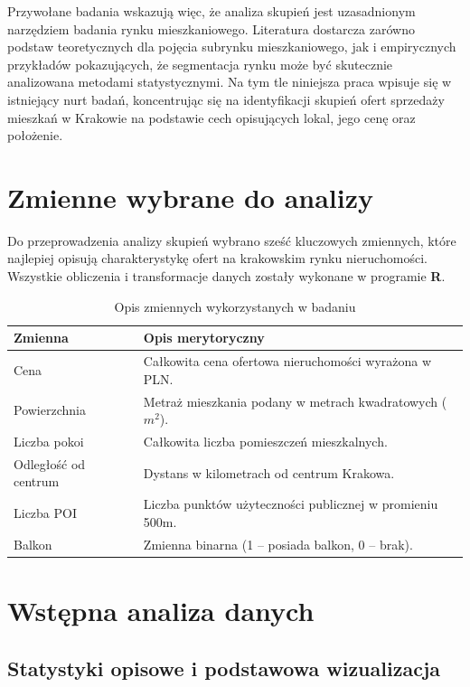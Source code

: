 \documentclass{report}
\begin{document}
Przywołane badania wskazują więc, że analiza skupień jest uzasadnionym narzędziem badania rynku mieszkaniowego. Literatura dostarcza zarówno podstaw teoretycznych dla pojęcia subrynku mieszkaniowego, jak i empirycznych przykładów pokazujących, że segmentacja rynku może być skutecznie analizowana metodami statystycznymi. Na tym tle niniejsza praca wpisuje się w istniejący nurt badań, koncentrując się na identyfikacji skupień ofert sprzedaży mieszkań w Krakowie na podstawie cech opisujących lokal, jego cenę oraz położenie.



\section{Zmienne wybrane do analizy}

Do przeprowadzenia analizy skupień wybrano sześć kluczowych zmiennych, które najlepiej opisują charakterystykę ofert na krakowskim rynku nieruchomości. Wszystkie obliczenia i transformacje danych zostały wykonane w programie \textbf{R}.

\begin{table}[H]
\centering
\caption{Opis zmiennych wykorzystanych w badaniu}
\begin{tabular}{|l|l|}
\hline
\textbf{Zmienna} & \textbf{Opis merytoryczny} \\ \hline
Cena & Całkowita cena ofertowa nieruchomości wyrażona w PLN. \\ \hline
Powierzchnia & Metraż mieszkania podany w metrach kwadratowych ($m^2$). \\ \hline
Liczba pokoi & Całkowita liczba pomieszczeń mieszkalnych. \\ \hline
Odległość od centrum & Dystans w kilometrach od centrum Krakowa. \\ \hline
Liczba POI & Liczba punktów użyteczności publicznej w promieniu 500m. \\ \hline
Balkon & Zmienna binarna (1 – posiada balkon, 0 – brak). \\ \hline
\end{tabular}
\end{table}

\section{Wstępna analiza danych}

\subsection{Statystyki opisowe i podstawowa wizualizacja}
\end{document}
